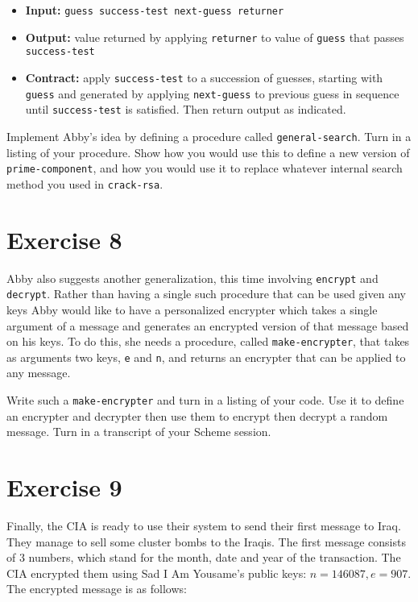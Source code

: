 \begin{itemize}

\item {\bf Input:} {\tt guess success-test next-guess returner}

\item {\bf Output:}  value returned by applying {\tt returner} to value of
{\tt guess} that passes {\tt success-test}

\item {\bf Contract:}  apply {\tt success-test} to a succession of guesses,
starting with {\tt guess} and generated by applying {\tt next-guess}
to previous guess in sequence until {\tt success-test} is satisfied.
Then return output as indicated.

\end{itemize}

Implement Abby's idea by defining a procedure called
{\tt general-search}.  Turn in a listing of your procedure. Show how
you would use this to define a new version of {\tt prime-component},
and how you would use it to replace whatever internal search method
you used in {\tt crack-rsa}.

\section{Exercise 8}

Abby also suggests another generalization, this time involving {\tt encrypt}
and {\tt decrypt}.  Rather than having a single such procedure that
can be used given any keys Abby would like to have a personalized
encrypter which takes a single argument  of a message and generates
an encrypted version of that message based on his keys.  To do this,
she needs a procedure, called {\tt make-encrypter}, that takes as
arguments two keys, {\tt e} and {\tt n}, and returns an encrypter that
can be applied to any message.

Write such a {\tt make-encrypter} and turn in a listing of your code.  Use it
to define an encrypter and decrypter then use them to encrypt then decrypt a
random message.  Turn in a transcript of your {\sc Scheme} session.

\section{Exercise 9}
Finally, the CIA is ready to use their system to send their first
message to Iraq.  They  manage to sell some cluster bombs to the Iraqis.
The first message consists of 3 numbers, which stand for the month, date and
year of the transaction.  The CIA encrypted them using Sad I Am Yousame's
public keys: $n = 146087, e = 907$.  The encrypted message is as follows:

